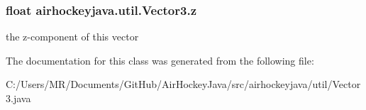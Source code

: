 \subsubsection[{z}]{\setlength{\rightskip}{0pt plus 5cm}float airhockeyjava.\+util.\+Vector3.\+z}\label{classairhockeyjava_1_1util_1_1_vector3_a9dd7662215506c01424bf8d953ec2117}
the z-\/component of this vector 

The documentation for this class was generated from the following file\+:\begin{DoxyCompactItemize}
\item 
C\+:/\+Users/\+M\+R/\+Documents/\+Git\+Hub/\+Air\+Hockey\+Java/src/airhockeyjava/util/Vector3.\+java\end{DoxyCompactItemize}
